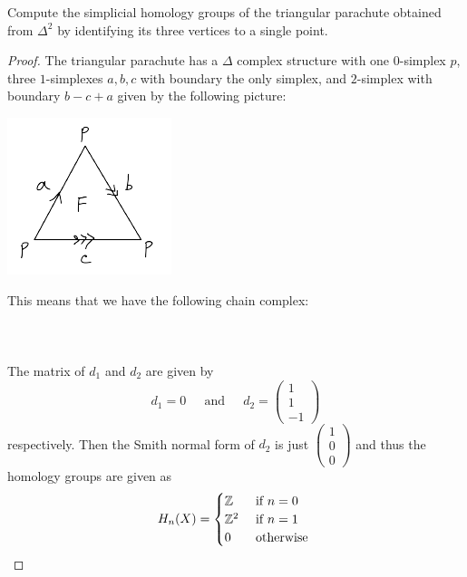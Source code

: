 \documentclass[a4paper]{article}
\begin{document}
\begin{ex}{}{} Compute the simplicial homology groups of the triangular parachute obtained from $\Delta^2$ by identifying its three vertices to a single point. \tcbline
\begin{proof}
The triangular parachute has a $\Delta$ complex structure with one $0$-simplex $p$, three $1$-simplexes $a,b,c$ with boundary the only simplex, and $2$-simplex with boundary $b-c+a$ given by the following picture: 

\begin{center}
\includegraphics[scale = 0.8]{Image 3}
\end{center}

This means that we have the following chain complex: \\~\\
\\~\\
The matrix of $d_1$ and $d_2$ are given by $$d_1=0\;\;\;\;\text{ and }\;\;\;\; d_2=\begin{pmatrix}
1\\1\\-1
\end{pmatrix}$$ respectively. Then the Smith normal form of $d_2$ is just $\begin{pmatrix}
1\\0\\0
\end{pmatrix}$ and thus the homology groups are given as $$H_n(X)=\begin{cases}
\mathbb{Z} & \text{ if } n=0\\
\mathbb{Z}^2 & \text{ if } n=1\\
0 & \text{ otherwise }
\end{cases}$$
\end{proof}
\end{ex}
\end{document}
